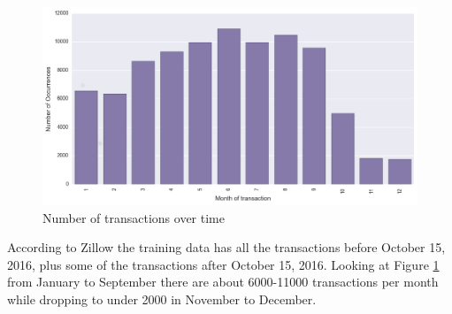 \documentclass[a4paper]{article}
\begin{document}
\begin{figure}
\centering
\includegraphics[width=1\textwidth]{./img/train-transactiondate.png}
\caption{\label{fig:transactions}Number of transactions over time}
\end{figure}
According to Zillow the training data has all the transactions before October 15, 2016, plus some of the transactions
after October 15, 2016. Looking at Figure \ref{fig:transactions} from January to September there are about 6000-11000
transactions per month while dropping to under 2000 in November to December.
\end{document}
